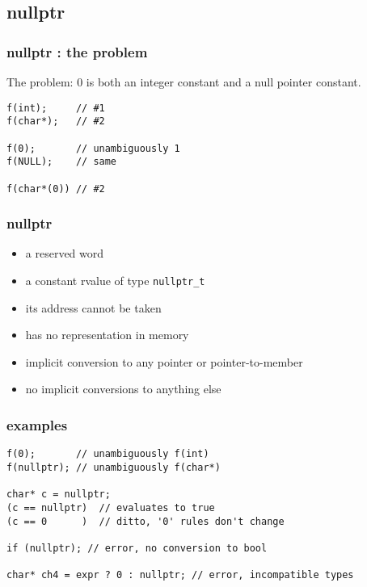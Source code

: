 \subsection{nullptr}
\lyxframeend{}


\begin{frame}[fragile]
\frametitle{nullptr : the problem}

The problem: 0 is both an integer constant and a null pointer
constant.

{\scriptsize
\begin{verbatim}
f(int);     // #1
f(char*);   // #2

f(0);       // unambiguously 1
f(NULL);    // same

f(char*(0)) // #2

\end{verbatim}
}
\end{frame}

\begin{frame}[fragile]
\frametitle{nullptr}

\begin{itemize}
\item a reserved word
\item a constant rvalue of type \texttt{nullptr\_t}
\item its address cannot be taken
\item has no representation in memory
\item implicit conversion to any pointer or pointer-to-member
\item no implicit conversions to anything else
\end{itemize}
\end{frame}
\begin{frame}[fragile]
\frametitle{examples}
{\scriptsize
\begin{verbatim}
f(0);       // unambiguously f(int)
f(nullptr); // unambiguously f(char*)

char* c = nullptr;
(c == nullptr)  // evaluates to true
(c == 0      )  // ditto, '0' rules don't change

if (nullptr); // error, no conversion to bool

char* ch4 = expr ? 0 : nullptr; // error, incompatible types

\end{verbatim}
}

\begin{center}



\end{center}


\end{frame}
